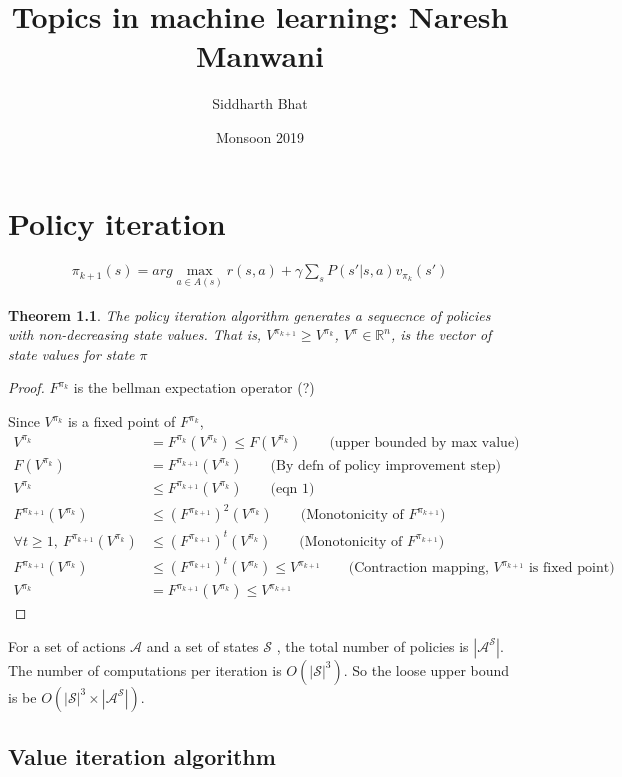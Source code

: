 \documentclass[11pt]{book}
\title{Topics in machine learning: Naresh Manwani}
\author{Siddharth Bhat}
\date{Monsoon 2019}
\newcommand{\St}{\ensuremath{\mathcal{S}} }
\newcommand{\Act}{\ensuremath{\mathcal{A}} }
\newcommand{\Rn}{\mathbb{R}^n}
\newcommand{\pik}{{\pi_{k}}}
\newcommand{\piknext}{{\pi_{k+1}}}
\newtheorem{theorem}{Theorem}
\newtheorem{proof}{Proof}
\begin{document}
\maketitle
\tableofcontents

\chapter{Policy iteration}
\begin{align*}
    \pi_{k+1}(s) = arg \max_{a \in A(s)} r(s, a) + \gamma \sum_{s} P(s'|s, a) v_{\pi_k}(s')
\end{align*}

\begin{theorem}
    The policy iteration algorithm generates a sequecnce of policies with
    non-decreasing state values. That is, ${V^\piknext} \geq V^\pik$, 
    $V^\pi \in \Rn$, is the vector of state values for state $\pi$
\end{theorem}
\begin{proof}
    $F^\pik$ is the bellman expectation operator (?)

    Since $V^\pik$ is a fixed point of $F^\pik$, 
    \begin{align*}
        V^\pik &= F^\pik (V^\pik) \leq F(V^\pik) \qquad \text{(upper bounded by max value)} \\
        F(V^\pik) &=  F^\piknext (V^\pik) \qquad \text{(By defn of policy improvement step)} \\
        V^\pik &\leq F^\piknext (V^\pik) \qquad \text{(eqn 1)} \\
        F^\piknext (V^\pik) &\leq {(F^\piknext)}^2 (V^\pik) \qquad \text{(Monotonicity of $F^\piknext$)} \\
        \forall t \geq 1, ~F^\piknext (V^\pik) &\leq {(F^\piknext)}^t (V^\pik) \qquad \text{(Monotonicity of $F^\piknext$)} \\
        F^\piknext (V^\pik) &\leq {(F^\piknext)}^t (V^\pik) \leq V^\piknext \qquad \text{(Contraction mapping, $V^\piknext$ is fixed point)}
        \\
        V^\pik &= F^\piknext (V^\pik) \leq V^{\piknext}
    \end{align*}
\end{proof}

For a set of actions \Act and a set of states \St, the total number of
policies is ${|\Act^\St|}$. The number of computations per iteration is
$O(|\St|^3)$. So the loose upper bound is be ${O(|\St|^3 \times |\Act^\St|)}$.

\section{Value iteration algorithm}
\end{document}
